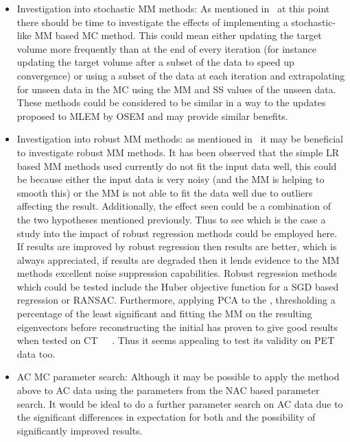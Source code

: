 \begin{itemize}
                \item Investigation into stochastic \gls{MM} methods: As mentioned in~ at this point there should be time to investigate the effects of implementing a stochastic-like \gls{MM} based \gls{MC} method. This could mean either updating the target volume more frequently than at the end of every iteration (for instance updating the target volume after a subset of the data to speed up convergence) or using a subset of the data at each iteration and extrapolating  for unseen data in the \gls{MC} using the \gls{MM} and \gls{SS} values of the unseen data. These methods could be considered to be similar in a way to the updates proposed to \gls{MLEM} by \gls{OSEM} and may provide similar benefits.
    
                \item Investigation into robust \gls{MM} methods: as mentioned in~ it may be beneficial to investigate robust \gls{MM} methods. It has been observed that the simple \gls{LR} based \gls{MM} methods used currently do not fit the input data well, this could be because either the input data is very noisy (and the \gls{MM} is helping to smooth this) or the \gls{MM} is not able to fit the data well due to outliers affecting the result. Additionally, the effect seen could be a combination of the two hypotheses mentioned previously. Thus to see which is the case a study into the impact of robust regression methods could be employed here. If results are improved by robust regression then results are better, which is always appreciated, if results are degraded then it lends evidence to the \gls{MM} methods excellent noise suppression capabilities. Robust regression methods which could be tested include the Huber objective function for a \gls{SGD} based regression or \gls{RANSAC}. Furthermore, applying \gls{PCA} to the , thresholding a percentage of the least significant  and fitting the \gls{MM} on the resulting eigenvectors before reconstructing the initial  has proven to give good results when tested on \gls{CT}~~~. Thus it seems appealing to test its validity on \gls{PET} data too.
    
                \item \gls{AC} \gls{MC} parameter search: Although it may be possible to apply the method above to \gls{AC} data using the parameters from the \gls{NAC} based parameter search. It would be ideal to do a further parameter search on \gls{AC} data due to the significant differences in expectation for both and the possibility of significantly improved results.
    

\end{itemize}
